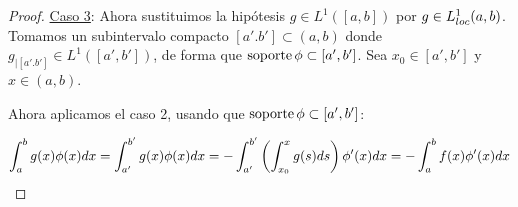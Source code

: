 \begin{proof}
\underline{Caso 3}: Ahora sustituimos la hipótesis $g\in L^1([a,b])$ por $g\in L^1_{loc}(a,b)$. Tomamos un subintervalo compacto $[a'.b']\subset(a,b)$ donde $g_{|[a'.b']}\in L^1([a',b'])$, de forma que $\operatorname{soporte}\phi\subset[a',b']$. Sea $x_0\in[a',b']$ y $x\in(a,b)$.

Ahora aplicamos el caso 2, usando que $\operatorname{soporte}\phi\subset[a',b']$:

\[
\displaystyle\int_{ a }^{ b } g(x)\phi(x)dx=\displaystyle\int_{ a' }^{ b' } g(x)\phi(x)dx=-\displaystyle\int_{ a' }^{ b' } \left(\displaystyle\int_{ x_0 }^{ x } g(s)ds\right)\phi'(x)dx=-\displaystyle\int_{ a }^{ b } f(x)\phi'(x)dx
\]

\end{proof}
